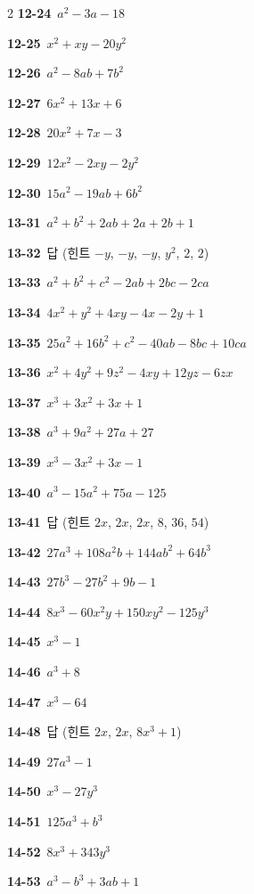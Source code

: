\documentclass[10pt,a4paper]{article}
\begin{document}
\begin{multicols}{2}
\noindent\textbf{12-24}\ $a^2-3a-18$\par
\noindent\textbf{12-25}\ $x^2+xy-20y^2$\par
\noindent\textbf{12-26}\ $a^2-8ab+7b^2$\par
\noindent\textbf{12-27}\ $6x^2+13x+6$\par
\noindent\textbf{12-28}\ $20x^2+7x-3$\par
\noindent\textbf{12-29}\ $12x^2-2xy-2y^2$\par
\noindent\textbf{12-30}\ $15a^2-19ab+6b^2$\par
\noindent\textbf{13-31}\ $a^2+b^2+2ab+2a+2b+1$\par
\noindent\textbf{13-32}\ 답 (힌트 $-y$, $-y$, $-y$, $y^2$, $2$, $2$)\par
\noindent\textbf{13-33}\ $a^2+b^2+c^2-2ab+2bc-2ca$\par
\noindent\textbf{13-34}\ $4x^2+y^2+4xy-4x-2y+1$\par
\noindent\textbf{13-35}\ $25a^2+16b^2+c^2-40ab-8bc+10ca$\par
\noindent\textbf{13-36}\ $x^2+4y^2+9z^2-4xy+12yz-6zx$\par
\noindent\textbf{13-37}\ $x^3+3x^2+3x+1$\par
\noindent\textbf{13-38}\ $a^3+9a^2+27a+27$\par
\noindent\textbf{13-39}\ $x^3-3x^2+3x-1$\par
\noindent\textbf{13-40}\ $a^3-15a^2+75a-125$\par
\noindent\textbf{13-41}\ 답 (힌트 $2x$, $2x$, $2x$, $8$, $36$, $54$)\par
\noindent\textbf{13-42}\ $27a^3+108a^2b+144ab^2+64b^3$\par
\noindent\textbf{14-43}\ $27b^3-27b^2+9b-1$\par
\noindent\textbf{14-44}\ $8x^3-60x^2y+150xy^2-125y^3$\par
\noindent\textbf{14-45}\ $x^3-1$\par
\noindent\textbf{14-46}\ $a^3+8$\par
\noindent\textbf{14-47}\ $x^3-64$\par
\noindent\textbf{14-48}\ 답 (힌트 $2x$, $2x$, $8x^3+1$)\par
\noindent\textbf{14-49}\ $27a^3-1$\par
\noindent\textbf{14-50}\ $x^3-27y^3$\par
\noindent\textbf{14-51}\ $125a^3+b^3$\par
\noindent\textbf{14-52}\ $8x^3+343y^3$\par
\noindent\textbf{14-53}\ $a^3-b^3+3ab+1$\par

\end{multicols}
\end{document}
